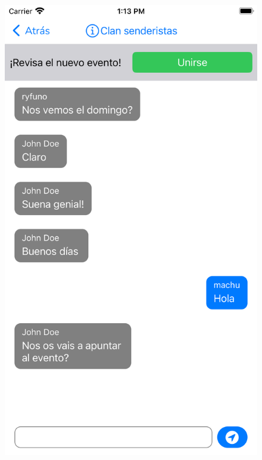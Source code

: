 \begin{appendices}
\begin{figure}[H]
        \centering
        \begin{minipage}{0.3\textwidth}
            \centering
            \includegraphics[cframe=black 2pt,width=1\linewidth]{images/manual/abandonarEventoBotón.png}
        \end{minipage}
        \begin{minipage}{0.3\textwidth}
            \centering

\end{minipage}
\end{figure}
\end{appendices}
